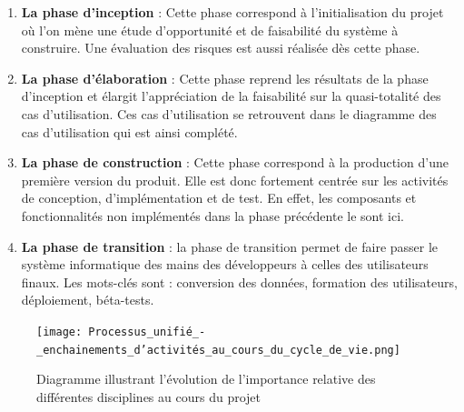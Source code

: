             \par
            \begin{enumerate}
                \setlength{\itemsep}{0pt}
                \item \textbf{La phase d'inception} : Cette phase correspond à l’initialisation du
                projet où l’on mène une étude d’opportunité et de faisabilité du système
                à construire. Une évaluation des risques est aussi réalisée dès cette phase.
                \item \textbf{La phase d’élaboration} : Cette phase reprend les résultats de
                la phase d'inception et élargit l’appréciation de la faisabilité sur la quasi-totalité
                des cas d’utilisation. Ces cas d’utilisation se retrouvent dans le diagramme
                des cas d’utilisation qui est ainsi complété.
                \item \textbf{La phase de construction} : Cette phase correspond à la production
                d’une première version du produit. Elle est donc fortement centrée sur les activités
                de conception, d’implémentation et de test. En effet, les composants et
                fonctionnalités non implémentés dans la phase précédente le sont ici.
                \item \textbf{La phase de transition} : la phase de transition permet de faire
                passer le système informatique des mains des développeurs à celles des utilisateurs finaux.
                Les mots-clés sont : conversion des données, formation des utilisateurs,
                déploiement, béta-tests. \cite{Roques2008}
            \end{enumerate}
            \begin{figure}[H]
                \centering
                \texttt{[image: Processus\_unifié\_-\_enchainements\_d'activités\_au\_cours\_du\_cycle\_de\_vie.png]}
                \caption{Diagramme illustrant l’évolution de l’importance
                relative des différentes disciplines au cours du projet}
                \label{fig:UpsProfil}
            \end{figure}
            
